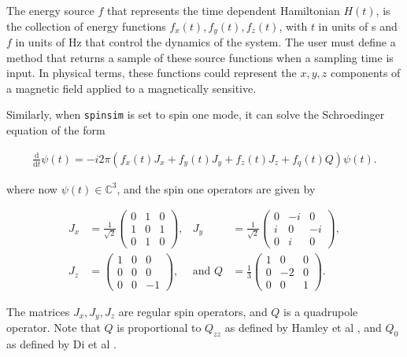 \documentclass{jors}
\begin{document}
			The energy source \(f\) that represents the time dependent Hamiltonian \(H(t)\), is the collection of energy functions \(f_x(t), f_y(t), f_z(t)\), with \(t\) in units of s and \(f\) in units of Hz that control the dynamics of the system. The user must define a method that returns a sample of these source functions when a sampling time is input. In physical terms, these functions could represent the \(x,y,z\) components of a magnetic field applied to a magnetically sensitive.

			Similarly, when \texttt{spinsim} is set to spin one mode, it can solve the Schroedinger equation of the form

			\begin{align}
				\frac{\mathrm{d}}{\mathrm{d}t}\psi(t) = -i 2\pi (f_x(t) J_x + f_y(t) J_y + f_z(t) J_z + f_q(t) Q) \psi(t).
			\end{align}

			where now \(\psi(t) \in \mathbb{C}^3\), and the spin one operators are given by

			\begin{align}
				J_x &= \frac{1}{\sqrt{2}}\begin{pmatrix}
					0 & 1 & 0 \\
					1 & 0 & 1 \\
					0 & 1 & 0
				\end{pmatrix},&
				J_y &= \frac{1}{\sqrt{2}}\begin{pmatrix}
					0 & -i &  0 \\
					i &  0 & -i \\
					0 &  i &  0
				\end{pmatrix},\nonumber\\
				J_z &= \begin{pmatrix}
					1 & 0 &  0 \\
					0 & 0 &  0 \\
					0 & 0 & -1
				\end{pmatrix},&
				\textrm{and }Q &= \frac{1}{3}\begin{pmatrix}
					1 &  0 & 0 \\
					0 & -2 & 0 \\
					0 &  0 & 1
				\end{pmatrix}.
			\end{align}

			The matrices \(J_x, J_y, J_z\) are regular spin operators, and \(Q\) is a quadrupole operator. Note that \(Q\) is proportional to \(Q_{zz}\) as defined by Hamley et al \cite{hamley_spin-nematic_2012}, and \(Q_0\) as defined by Di et al \cite{di_dipolequadrupole_2010}.
\end{document}
